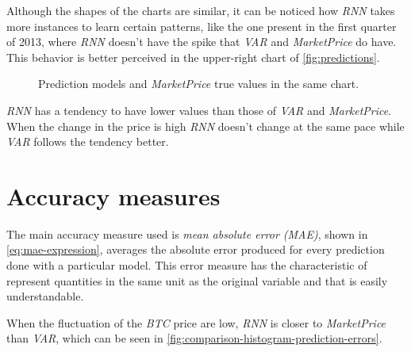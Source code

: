 Although the shapes of the charts are similar, it can be noticed how
\textit{RNN} takes more instances to learn certain patterns, like the
one present in the first quarter of 2013, where \textit{RNN} doesn't
have the spike that \textit{VAR} and \textit{MarketPrice} do have.
This behavior is better perceived in the upper-right chart of
\autoref{fig:predictions}.

\begin{figure}[bth]
  \caption{Prediction models and \textit{MarketPrice} true values in
    the same chart.}
  \label{fig:predictions}
\end{figure}

\textit{RNN} has a tendency to have lower values than those of
\textit{VAR} and \textit{MarketPrice}. When the change in the price is
high \textit{RNN} doesn't change at the same pace while \textit{VAR}
follows the tendency better.

\section{Accuracy measures}
\label{sec:accuracy-measures}

The main accuracy measure used is \textit{mean absolute error (MAE)},
shown in \autoref{eq:mae-expression}, averages the absolute error
produced for every prediction done with a particular model. This error
measure has the characteristic of represent quantities in the same
unit as the original variable and that is easily understandable.

When the fluctuation of the \textit{BTC} price are low, \textit{RNN}
is closer to \textit{MarketPrice} than \textit{VAR}, which can be seen
in \autoref{fig:comparison-histogram-prediction-errors}.

